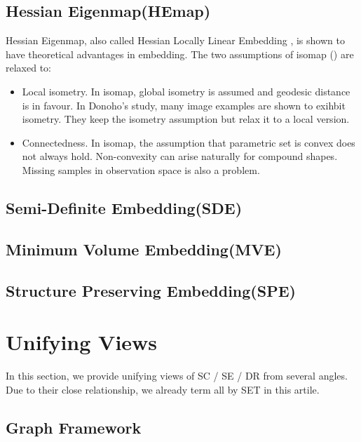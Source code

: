 \subsection{Hessian Eigenmap(HEmap)}
\label{sec:hemap}

Hessian Eigenmap, also called Hessian Locally Linear Embedding
\cite{donoho2003hessian}, is shown to have theoretical 
advantages in embedding. The two assumptions of isomap
(\rsec{\ref{sec:isomap}}) are relaxed to:
\begin{itemize}
	\item Local isometry. In isomap, global isometry is assumed 
	and geodesic distance is in favour. In Donoho's study, 
	many image examples are shown to exihbit isometry\cite{donoho2003hessian}. 
	They keep the isometry assumption but relax it to a local version. 
	\item Connectedness. In isomap, the assumption that 
	parametric set is convex does not always hold. Non-convexity
	can arise naturally for compound shapes. Missing samples 
	in observation space is also a problem. 
\end{itemize} 

\subsection{Semi-Definite Embedding(SDE)}
\label{sec:sde}


\subsection{Minimum Volume Embedding(MVE)}
\label{sec:mve}


\subsection{Structure Preserving Embedding(SPE)}
\label{sec:spe}


\section{Unifying Views}
\label{sec:unify}

In this section, we provide unifying views of SC / SE / DR
from several angles. Due to their close relationship, 
we already term all by SET in this artile. 

\subsection{Graph Framework}
\label{sec:gfx}

